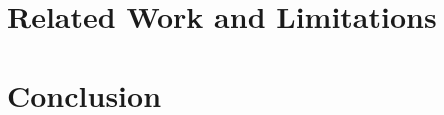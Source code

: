\documentclass[10pt,twocolumn]{article}
\begin{document}
\section{Related Work and Limitations}



\section{Conclusion}




\end{document}
